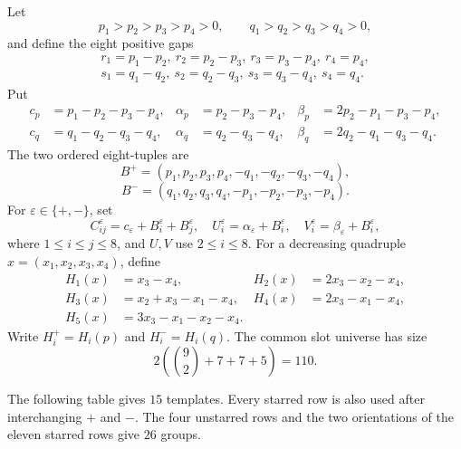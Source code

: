 \documentclass[11pt,a4paper]{article}
\theoremstyle{remark}
\begin{document}
Let
\[
 p_1>p_2>p_3>p_4>0,
 \qquad q_1>q_2>q_3>q_4>0,
\]
and define the eight positive gaps
\[
\begin{gathered}
 r_1=p_1-p_2,\ r_2=p_2-p_3,\ r_3=p_3-p_4,\ r_4=p_4,\\
 s_1=q_1-q_2,\ s_2=q_2-q_3,\ s_3=q_3-q_4,\ s_4=q_4.
\end{gathered}
\]
Put
\[
\begin{aligned}
 c_p&=p_1-p_2-p_3-p_4,&
 \alpha_p&=p_2-p_3-p_4,&
 \beta_p&=2p_2-p_1-p_3-p_4,\\
 c_q&=q_1-q_2-q_3-q_4,&
 \alpha_q&=q_2-q_3-q_4,&
 \beta_q&=2q_2-q_1-q_3-q_4.
\end{aligned}
\]
The two ordered eight-tuples are
\[
 B^+=(p_1,p_2,p_3,p_4,-q_1,-q_2,-q_3,-q_4),
\]
\[
 B^-=(q_1,q_2,q_3,q_4,-p_1,-p_2,-p_3,-p_4).
\]
For $\varepsilon\in\{+,-\}$, set
\[
 C^\varepsilon_{ij}=c_\varepsilon+B^\varepsilon_i+B^\varepsilon_j,
 \quad
 U^\varepsilon_i=\alpha_\varepsilon+B^\varepsilon_i,
 \quad
 V^\varepsilon_i=\beta_\varepsilon+B^\varepsilon_i,
\]
where $1\leq i\leq j\leq8$, and $U,V$ use $2\leq i\leq8$.  For a decreasing
quadruple $x=(x_1,x_2,x_3,x_4)$, define
\[
\begin{aligned}
 H_1(x)&=x_3-x_4,& H_2(x)&=2x_3-x_2-x_4,\\
 H_3(x)&=x_2+x_3-x_1-x_4,& H_4(x)&=2x_3-x_1-x_4,\\
 H_5(x)&=3x_3-x_1-x_2-x_4.
\end{aligned}
\]
Write $H_i^+=H_i(p)$ and $H_i^-=H_i(q)$.  The common slot universe has size
\[
 2\left(\binom{9}{2}+7+7+5\right)=110.
\]

The following table gives $15$ templates.  Every starred row is also used
after interchanging $+$ and $-$.  The four unstarred rows and the two
orientations of the eleven starred rows give $26$ groups.
\end{document}
